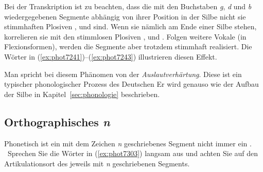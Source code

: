 \label{sec:auslautverhaertungphonetik}


Bei der Transkription ist zu beachten, dass die mit den Buchstaben \textit{g}, \textit{d} und \textit{b} wiedergegebenen Segmente abhängig von ihrer Position in der Silbe nicht sie stimmhaften Plosiven \textipa{[g]}, \textipa{[d]} und \textipa{[b]} sind.
Wenn sie nämlich am Ende einer Silbe stehen, korrelieren sie mit den stimmlosen Plosiven \textipa{[k]}, \textipa{[t]} und \textipa{[p]}.
Folgen weitere Vokale (\zB in Flexionsformen), werden die Segmente aber trotzdem stimmhaft realisiert.
Die Wörter in (\ref{ex:phot7241})--(\ref{ex:phot7243}) illustrieren diesen Effekt.

\begin{exe}
  \ex\label{ex:phot7241}
  \begin{xlist}
  \end{xlist}
  \ex\label{ex:phot7242}
  \begin{xlist}
  \end{xlist}
  \ex\label{ex:phot7243}
  \begin{xlist}
  \end{xlist}
\end{exe}

Man spricht bei diesem Phänomen von der \textit{Auslautverhärtung}.
Diese ist ein typischer phonologischer Prozess des Deutschen
Er wird genauso wie der Aufbau der Silbe in Kapitel~\ref{sec:phonologie} beschrieben.

\subsection{Orthographisches \textit{n}}

\label{sec:realisn}

Phonetisch ist ein mit dem Zeichen \textit{n} geschriebenes Segment nicht immer ein \textipa{[n]}.
\TuBegin~Sprechen Sie die Wörter in (\ref{ex:phot7303}) langsam aus und achten Sie auf den Artikulationsort des jeweils mit \textit{n} geschriebenen Segments.


